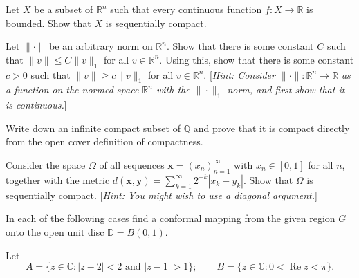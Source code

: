 \documentclass[answers]{exam}
\begin{document}
\begin{questions}
\question%
Let $X$ be a subset of $\mathbb{R}^{n}$ such that every continuous function $f: X \to \mathbb{R}$ is bounded. Show that $X$ is sequentially compact.



\question%
Let $\|\cdot\|$ be an arbitrary norm on $\mathbb{R}^{n}$. Show that there is some constant $C$ such that $\|v\| \leqslant C\|v\|_{1}$ for all $v \in \mathbb{R}^{n}$. Using this, show that there is some constant $c>0$ such that $\|v\| \geqslant c\|v\|_{1}$ for all $v \in \mathbb{R}^{n}$. [\emph{Hint: Consider $\|\cdot\|: \mathbb{R}^{n} \to \mathbb{R}$ as a function on the normed space $\mathbb{R}^{n}$ with the $\|\cdot\|_{1}$-norm, and first show that it is continuous.}]



\question%
Write down an infinite compact subset of $\mathbb{Q}$ and prove that it is compact directly from the open cover definition of compactness.



\question%
Consider the space $\Omega$ of all sequences $\mathbf{x}=\left(x_{n}\right)_{n=1}^{\infty}$ with $x_{n} \in[0,1]$ for all $n$, together with the metric $d(\mathbf{x}, \mathbf{y})=\sum_{k=1}^{\infty} 2^{-k}\left|x_{k}-y_{k}\right|$. Show that $\Omega$ is sequentially compact. [\emph{Hint: You might wish to use a diagonal argument.}]



\question%
In each of the following cases find a conformal mapping from the given region $G$ onto the open unit disc $\mathbb D = B(0,1)$.



\question%
Let \[
	A=\{z\in\mathbb C:|z-2|<2\text{ and }|z-1|>1\};\qquad
	B=\{z\in\mathbb C:0<\operatorname{Re}z<\pi\}.
\]
\begin{parts}

\end{parts}
\end{questions}
\end{document}
